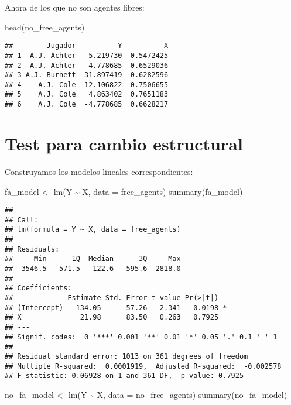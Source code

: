 \documentclass[
]{article}
\newenvironment{Shaded}{\begin{snugshade}}{\end{snugshade}}
\newcommand{\AttributeTok}[1]{\textcolor[rgb]{0.77,0.63,0.00}{#1}}
\newcommand{\FunctionTok}[1]{\textcolor[rgb]{0.00,0.00,0.00}{#1}}
\newcommand{\NormalTok}[1]{#1}
\newcommand{\OtherTok}[1]{\textcolor[rgb]{0.56,0.35,0.01}{#1}}
\newcommand{\SpecialCharTok}[1]{\textcolor[rgb]{0.00,0.00,0.00}{#1}}
\begin{document}
Ahora de los que no son agentes libres:

\begin{Shaded}
\begin{Highlighting}[]
\FunctionTok{head}\NormalTok{(no\_free\_agents)}
\end{Highlighting}
\end{Shaded}

\begin{verbatim}
##        Jugador          Y          X
## 1  A.J. Achter   5.219730 -0.5472425
## 2  A.J. Achter  -4.778685  0.6529036
## 3 A.J. Burnett -31.897419  0.6282596
## 4    A.J. Cole  12.106822  0.7506655
## 5    A.J. Cole   4.863402  0.7651183
## 6    A.J. Cole  -4.778685  0.6628217
\end{verbatim}

\section{Test para cambio estructural}

Construyamos los modelos lineales correspondientes:

\begin{Shaded}
\begin{Highlighting}[]
\NormalTok{fa\_model }\OtherTok{\textless{}{-}} \FunctionTok{lm}\NormalTok{(Y }\SpecialCharTok{\textasciitilde{}}\NormalTok{ X, }\AttributeTok{data =}\NormalTok{ free\_agents)}
\FunctionTok{summary}\NormalTok{(fa\_model)}
\end{Highlighting}
\end{Shaded}

\begin{verbatim}
## 
## Call:
## lm(formula = Y ~ X, data = free_agents)
## 
## Residuals:
##     Min      1Q  Median      3Q     Max 
## -3546.5  -571.5   122.6   595.6  2818.0 
## 
## Coefficients:
##             Estimate Std. Error t value Pr(>|t|)  
## (Intercept)  -134.05      57.26  -2.341   0.0198 *
## X              21.98      83.50   0.263   0.7925  
## ---
## Signif. codes:  0 '***' 0.001 '**' 0.01 '*' 0.05 '.' 0.1 ' ' 1
## 
## Residual standard error: 1013 on 361 degrees of freedom
## Multiple R-squared:  0.0001919,  Adjusted R-squared:  -0.002578 
## F-statistic: 0.06928 on 1 and 361 DF,  p-value: 0.7925
\end{verbatim}

\begin{Shaded}
\begin{Highlighting}[]
\NormalTok{no\_fa\_model }\OtherTok{\textless{}{-}} \FunctionTok{lm}\NormalTok{(Y }\SpecialCharTok{\textasciitilde{}}\NormalTok{ X, }\AttributeTok{data =}\NormalTok{ no\_free\_agents)}
\FunctionTok{summary}\NormalTok{(no\_fa\_model)}
\end{Highlighting}
\end{Shaded}
\end{document}

